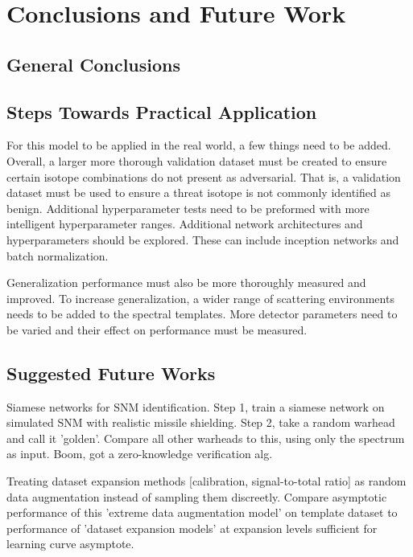 \chapter{Conclusions and Future Work}

\section{General Conclusions}


\section{Steps Towards Practical Application}

For this model to be applied in the real world, a few things need to be added. Overall, a larger more thorough validation dataset must be created to ensure certain isotope combinations do not present as adversarial. That is, a validation dataset must be used to ensure a threat isotope is not commonly identified as benign. Additional hyperparameter tests need to be preformed with more intelligent hyperparameter ranges. Additional network architectures and hyperparameters should be explored. These can include inception networks and batch normalization.

Generalization performance must also be more thoroughly measured and improved. To increase generalization, a wider range of scattering environments needs to be added to the spectral templates. More detector parameters need to be varied and their effect on performance must be measured. 



\section{Suggested Future Works}

Siamese networks for SNM identification. Step 1, train a siamese network on simulated SNM with realistic missile shielding. Step 2, take a random warhead and call it 'golden'. Compare all other warheads to this, using only the spectrum as input. Boom, got a zero-knowledge verification alg.

Treating dataset expansion methods [calibration, signal-to-total ratio] as random data augmentation instead of sampling them discreetly. Compare asymptotic performance of this 'extreme data augmentation model' on template dataset to performance of 'dataset expansion models' at expansion levels sufficient for learning curve asymptote. 

